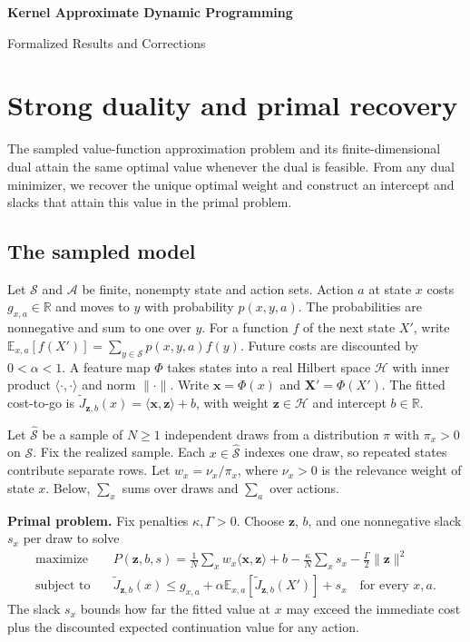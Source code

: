 \documentclass[12pt,a4paper]{article}
\numberwithin{equation}{section}
\newcommand{\ip}[2]{\langle #1,#2\rangle}
\newcommand{\norm}[1]{\lVert #1\rVert}
\newcommand{\R}{\mathbb R}
\newcommand{\lead}[1]{\par\smallskip\noindent\textbf{#1}\enspace}
\begin{document}
{\Large\bfseries Kernel Approximate Dynamic Programming\par}
{\large Formalized Results and Corrections\par}

\section{Strong duality and primal recovery}
The sampled value-function approximation problem and its finite-dimensional
dual attain the same optimal value whenever the dual is feasible. From any
dual minimizer, we recover the unique optimal weight and construct an
intercept and slacks that attain this value in the primal problem.

\subsection*{The sampled model}
Let \(\mathcal S\) and \(\mathcal A\) be finite, nonempty state and action sets.
Action \(a\) at state \(x\) costs \(g_{x,a}\in\R\) and moves to \(y\) with probability
\(p(x,y,a)\). The probabilities are nonnegative and sum to one over \(y\).
For a function \(f\) of the next state \(X'\), write
\(\mathbb E_{x,a}[f(X')]=\sum_{y\in\mathcal S}p(x,y,a)f(y)\).
Future costs are discounted by \(0<\alpha<1\).
A feature map \(\Phi\) takes states into a real Hilbert space \(\mathcal H\)
with inner product \(\ip{\cdot}{\cdot}\) and norm \(\norm{\cdot}\).
Write \(\mathbf x=\Phi(x)\) and \(\mathbf X'=\Phi(X')\). The fitted cost-to-go
is \(\widetilde J_{\mathbf z,b}(x)=\ip{\mathbf x}{\mathbf z}+b\), with
weight \(\mathbf z\in\mathcal H\) and intercept \(b\in\R\).

Let \(\widehat{\mathcal S}\) be a sample of \(N\ge1\) independent draws from
a distribution \(\pi\) with \(\pi_x>0\) on \(\mathcal S\). Fix the realized sample.
Each \(x\in\widehat{\mathcal S}\) indexes one draw, so repeated states contribute
separate rows. Let \(w_x=\nu_x/\pi_x\), where \(\nu_x>0\) is the relevance
weight of state \(x\). Below, \(\sum_x\) sums over draws and \(\sum_a\) over actions.

\lead{Primal problem.} Fix penalties \(\kappa,\Gamma>0\). Choose
\(\mathbf z\), \(b\), and one nonnegative slack \(s_x\) per draw to solve
\[
 \begin{aligned}
   \text{maximize}\quad &P(\mathbf z,b,s)=
     \frac1N\sum_x w_x\ip{\mathbf x}{\mathbf z}+b
       -\frac{\kappa}{N}\sum_x s_x-\frac{\Gamma}{2}\norm{\mathbf z}^2\\
   \text{subject to}\quad &
     \widetilde J_{\mathbf z,b}(x)\le g_{x,a}
        +\alpha\mathbb E_{x,a}[\widetilde J_{\mathbf z,b}(X')]+s_x
        \quad\text{for every }x,a .
 \end{aligned}
 \tag{P}
\]
The slack \(s_x\) bounds how far the fitted value at \(x\) may exceed the
immediate cost plus the discounted expected continuation value for any action.
\end{document}
